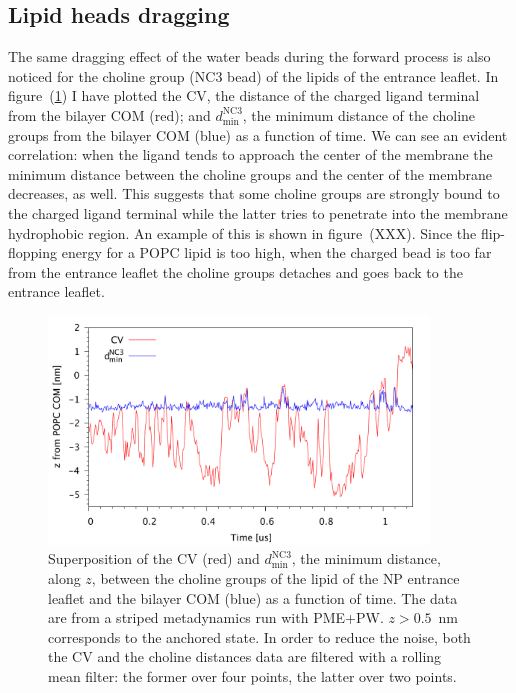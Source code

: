 \subsection{Lipid heads dragging}
The same dragging effect of the water beads during the forward process is also noticed for the choline group (NC$3$ \martini bead) of the lipids of the entrance leaflet. In figure~(\ref{fig:NC3Correlation}) I have plotted the \ac{CV}, the distance of the charged ligand terminal from the bilayer \ac{COM} (red); and $d_\text{min}^{\text{NC}3}$, the minimum distance of the choline groups from the bilayer \ac{COM} (blue) as a function of time. We can see an evident correlation: when the ligand tends to approach the center of the membrane the minimum distance between the choline groups and the center of the membrane decreases, as well. This suggests that some choline groups are strongly bound to the charged ligand terminal while the latter tries to penetrate into the membrane hydrophobic region. An example of this is shown in figure~(XXX). 
Since the flip-flopping energy for a \ac{POPC} lipid is too high, when the charged bead is too far from the entrance leaflet the choline groups detaches and goes back to the entrance leaflet. 
\begin{figure}[!ht]
	\center
	\includegraphics[width=0.9\textwidth]{./img/results/NC3Correlation}
	\caption{Superposition of the \acs{CV} (red) and $d_\text{min}^{\text{NC}3}$, the minimum distance, along $z$, between the choline groups of the lipid of the \acs{NP} entrance leaflet and the bilayer \acs{COM} (blue) as a function of time. The data are from a striped metadynamics run with \acs{PME}+\acs{PW}. $z>0.5$~nm corresponds to the anchored state. In order to reduce the noise, both the \ac{CV} and the choline  distances data are filtered with a rolling mean filter: the former over four points, the latter over two points.}%
	\label{fig:NC3Correlation}
\end{figure}

